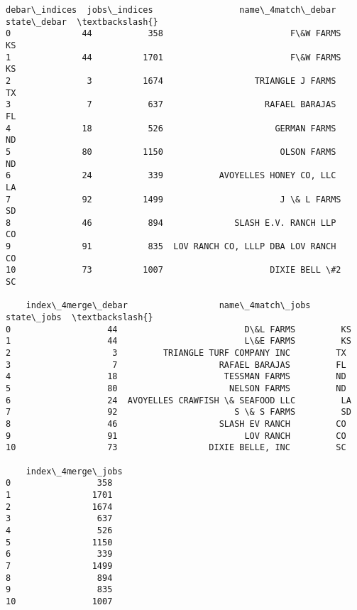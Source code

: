 \documentclass[11pt]{article}
\makeatletter
\newcommand{\boxspacing}{\kern\kvtcb@left@rule\kern\kvtcb@boxsep}
\newcommand{\prompt}[4]{
        {\ttfamily\llap{{\color{#2}[#3]:\hspace{3pt}#4}}\vspace{-\baselineskip}}
    }
\makeatother
\begin{document}
            \begin{tcolorbox}[breakable, size=fbox, boxrule=.5pt, pad at break*=1mm, opacityfill=0]
\prompt{Out}{outcolor}{179}{\boxspacing}
\begin{Verbatim}[commandchars=\\\{\}]
    debar\_indices  jobs\_indices                 name\_4match\_debar state\_debar  \textbackslash{}
0              44           358                         F\&W FARMS          KS
1              44          1701                         F\&W FARMS          KS
2               3          1674                  TRIANGLE J FARMS          TX
3               7           637                    RAFAEL BARAJAS          FL
4              18           526                      GERMAN FARMS          ND
5              80          1150                       OLSON FARMS          ND
6              24           339           AVOYELLES HONEY CO, LLC          LA
7              92          1499                       J \& L FARMS          SD
8              46           894              SLASH E.V. RANCH LLP          CO
9              91           835  LOV RANCH CO, LLLP DBA LOV RANCH          CO
10             73          1007                     DIXIE BELL \#2          SC

    index\_4merge\_debar                  name\_4match\_jobs state\_jobs  \textbackslash{}
0                   44                         D\&L FARMS         KS
1                   44                         L\&E FARMS         KS
2                    3         TRIANGLE TURF COMPANY INC         TX
3                    7                    RAFAEL BARAJAS         FL
4                   18                     TESSMAN FARMS         ND
5                   80                      NELSON FARMS         ND
6                   24  AVOYELLES CRAWFISH \& SEAFOOD LLC         LA
7                   92                       S \& S FARMS         SD
8                   46                    SLASH EV RANCH         CO
9                   91                         LOV RANCH         CO
10                  73                  DIXIE BELLE, INC         SC

    index\_4merge\_jobs
0                 358
1                1701
2                1674
3                 637
4                 526
5                1150
6                 339
7                1499
8                 894
9                 835
10               1007
\end{Verbatim}
\end{tcolorbox}
        
\end{document}
